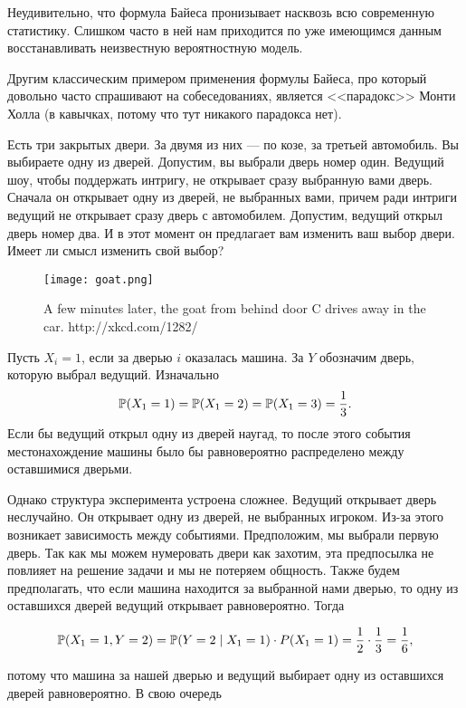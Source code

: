 Неудивительно, что формула Байеса пронизывает насквозь всю современную статистику. Слишком часто в ней нам приходится по уже имеющимся данным восстанавливать неизвестную вероятностную модель. 

Другим классическим примером применения формулы Байеса, про который довольно часто спрашивают на собеседованиях, является  <<парадокс>> Монти Холла (в кавычках, потому что тут никакого парадокса нет).

\begin{chudo}
Есть три закрытых двери. За двумя из них — по козе, за третьей автомобиль. Вы выбираете одну из дверей. Допустим, вы выбрали дверь номер один.  Ведущий шоу, чтобы поддержать интригу, не открывает сразу выбранную вами дверь. Сначала он открывает одну из дверей, не выбранных вами, причем ради интриги ведущий не открывает сразу дверь с автомобилем. Допустим, ведущий открыл дверь номер два. И в этот момент он предлагает вам изменить ваш выбор двери. Имеет ли смысл изменить свой выбор? 
\end{chudo}

\begin{figure}
\begin{center}
\texttt{[image: goat.png]}
\end{center}
\caption{A few minutes later, the goat from behind door C drives away in the car. http://xkcd.com/1282/}
\end{figure}

Пусть $X_i = 1$, если за дверью $i$ оказалась машина. За $Y$ обозначим дверь, которую выбрал ведущий. Изначально \[\mathbb{P}(X_1 = 1) = \mathbb{P}(X_1 = 2) = \mathbb{P}(X_1 = 3) = \frac{1}{3}.\]  Если бы ведущий открыл одну из дверей наугад, то после этого события местонахождение машины было бы равновероятно распределено между оставшимися дверьми. 

Однако структура эксперимента устроена сложнее. Ведущий открывает дверь неслучайно. Он открывает одну из дверей, не выбранных игроком.  Из-за этого возникает зависимость между событиями. Предположим, мы выбрали первую дверь. Так как мы можем нумеровать двери как захотим, эта предпосылка не повлияет на решение задачи и мы не потеряем общность. Также будем предполагать, что если машина находится за выбранной нами дверью, то одну из оставшихся дверей ведущий открывает равновероятно.  Тогда 

\[ \mathbb{P}(X_1 = 1, Y = 2) = \mathbb{P}(Y=2 \mid X_1 = 1) \cdot P(X_1 = 1) = \frac{1}{2} \cdot \frac{1}{3} = \frac{1}{6},\]

потому что машина за нашей дверью и ведущий выбирает одну из оставшихся дверей равновероятно.  В свою очередь 

